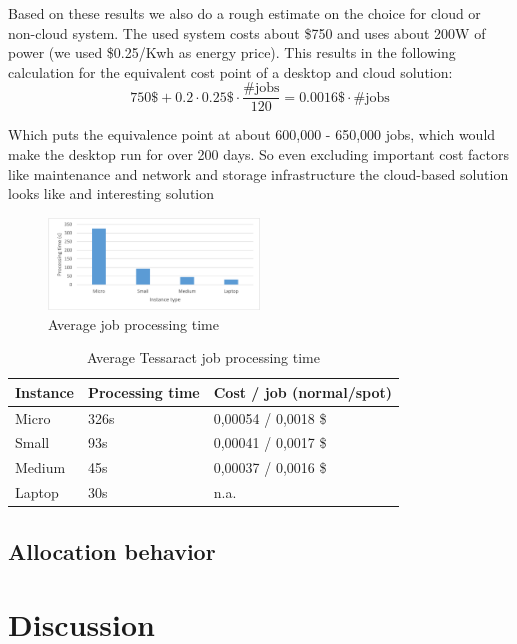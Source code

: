 \documentclass[a4paper]{IEEEtran}
\begin{document}
Based on these results we also do a rough estimate on the choice for cloud or non-cloud system. The used system costs about \$750 and uses about 200W of power (we used \$0.25/Kwh as energy price). This results in the following calculation for the equivalent cost point of a desktop and cloud solution:
$$
750\$ + 0.2 \cdot 0.25\$ \cdot \frac{\text{\#jobs}}{120} = 0.0016\$ \cdot \text{\#jobs}
$$

Which puts the equivalence point at about 600,000 - 650,000 jobs, which would make the desktop run for over 200 days. So even excluding important cost factors like maintenance and network and storage infrastructure the cloud-based solution looks like and interesting solution 

\begin{figure}
\centering
\includegraphics[width=0.5\textwidth]{"results-tessaract"}
\caption{Average job processing time}
\label{fig_tesperfresults}
\end{figure}

\begin{table}
\caption{Average Tessaract job processing time}
\label{tesperfresults}
\centering
\begin{tabular}{| l | l | l |}
\hline
Instance & Processing time & Cost / job (normal/spot) \\ \hline
Micro & 326s & 0,00054 / 0,0018 \$ \\ \hline
Small & 93s & 0,00041 / 0,0017 \$ \\ \hline
Medium & 45s & 0,00037 / 0,0016 \$ \\ \hline
Laptop & 30s & n.a. \\ \hline
\end{tabular}
\end{table}

\subsection{Allocation behavior}

\section{Discussion}
\end{document}
